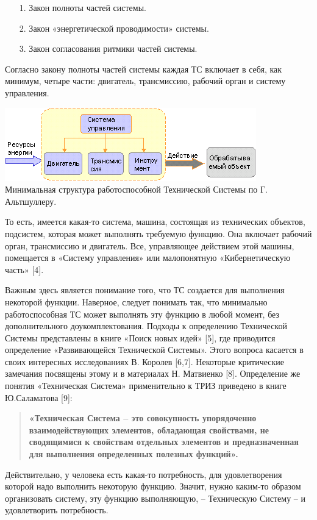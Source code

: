 \documentclass[11pt,a4paper]{article}
\begin{document}
\begin{itemize}
\item[1.] Закон полноты частей системы. 
\item[2.] Закон «энергетической проводимости» системы. 
\item[3.] Закон согласования ритмики частей системы. 
\end{itemize}
Согласно закону полноты частей системы каждая ТС включает в себя, как минимум,
четыре части: двигатель, трансмиссию, рабочий орган и систему управления.
\begin{center}\small
  \includegraphics[width=.6\textwidth]{mts-1.png}\\
  Минимальная структура работоспособной Технической Системы по Г. Альтшуллеру.
\end{center}
То есть, имеется какая-то система, машина, состоящая из технических объектов,
подсистем, которая может выполнять требуемую функцию. Она включает рабочий
орган, трансмиссию и двигатель. Все, управляющее действием этой машины,
помещается в «Систему управления» или малопонятную «Кибернетическую часть»
[4].

Важным здесь является понимание того, что ТС создается для выполнения
некоторой функции. Наверное, следует понимать так, что минимально
работоспособная ТС может выполнять эту функцию в любой момент, без
дополнительного доукомплектования. Подходы к определению Технической Системы
представлены в книге «Поиск новых идей» [5], где приводится определение
«Развивающейся Технической Системы». Этого вопроса касается в своих интересных
исследованиях В. Королев [6,7]. Некоторые критические замечания посвящены
этому и в материалах Н. Матвиенко [8]. Определение же понятия «Техническая
Система» применительно к ТРИЗ приведено в книге Ю.Саламатова [9]:
\begin{quote}\bf
  «Техническая Система – это совокупность упорядоченно взаимодействующих
  элементов, обладающая свойствами, не сводящимися к свойствам отдельных
  элементов и предназначенная для выполнения определенных полезных функций».
\end{quote}

Действительно, у человека есть какая-то потребность, для удовлетворения
которой надо выполнить некоторую функцию. Значит, нужно каким-то образом
организовать систему, эту функцию выполняющую, – Техническую Систему – и
удовлетворить потребность.
\end{document}
